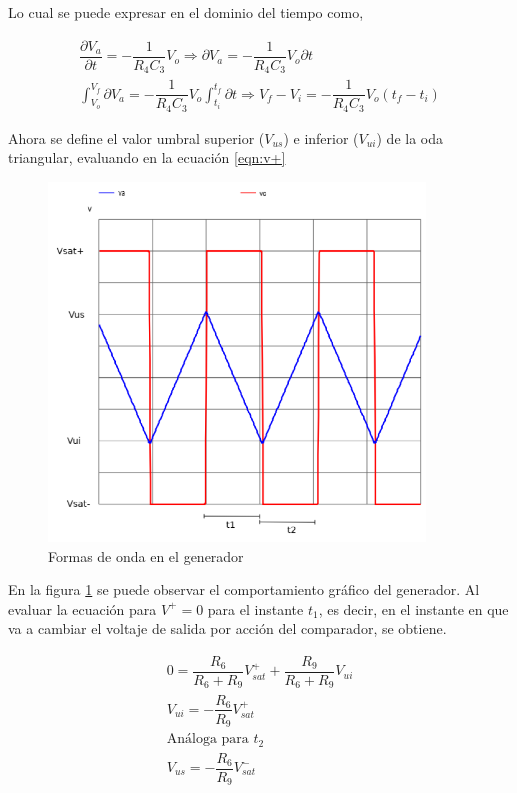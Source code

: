 \begin{enumerate}
                Lo cual se puede expresar en el dominio del tiempo como,

                \begin{gather}
                    \dfrac{\partial V_a}{\partial t}=-\dfrac{1}{R_4C_3}V_o \Rightarrow \partial{V_a}=-\dfrac{1}{R_4C_3}V_o\partial t \nonumber \\[0.5cm]
                    \int_{V_o}^{V_f}\partial V_a=-\dfrac{1}{R_4C_3}V_o \int_{t_i}^{t_f}\partial t \Rightarrow V_f-V_i=-\dfrac{1}{R_4C_3}V_o (t_f-t_i) \label{eqn:dif_vyt}
                \end{gather}

                Ahora se define el valor umbral superior ($V_{us}$) e inferior ($V_{ui}$) de la oda triangular, evaluando en la ecuación \ref{eqn:v+}

                \begin{figure}[H]
                    \centering
                    \renewcommand{\figurename}{Gráfica}
                    \setcounter{figure}{10}
                    \includegraphics[width=10cm]{Imagenes/onda_gf.png}
                    \caption{Formas de onda en el generador}
                    \label{fig:ondas_gf}
                \end{figure}

                En la figura \ref{fig:ondas_gf} se puede observar el comportamiento gráfico del generador. Al evaluar la ecuación para $V^+=0$ para el instante $t_1$, es decir, en el instante en que va a cambiar el voltaje de salida por acción del comparador, se obtiene.

                \begin{gather}
                    0=\dfrac{R_6}{R_6+R_9}V_{sat}^++\dfrac{R_9}{R_6+R_9}V_{ui} \nonumber \\[0.5cm]
                    V_{ui}=-\dfrac{R_6}{R_9}V_{sat}^+ \label{eqn:vui} \\[0.5cm]
                    \text{Análoga para $t_2$ } \nonumber\\[0.5cm]
                    V_{us}=-\dfrac{R_6}{R_9}V_{sat}^- \label{eqn:vus} 
                \end{gather}


\end{enumerate}
